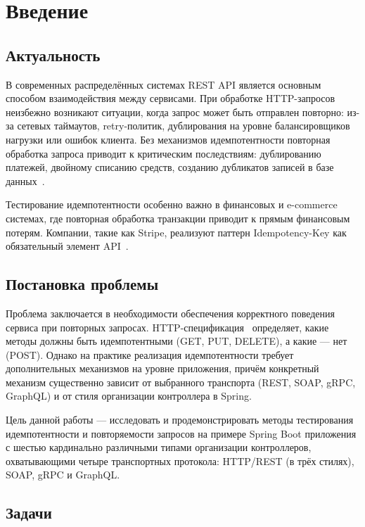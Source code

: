 \section{Введение}

\subsection{Актуальность}

В современных распределённых системах REST API является основным способом взаимодействия между сервисами. При обработке HTTP-запросов неизбежно возникают ситуации, когда запрос может быть отправлен повторно: из-за сетевых таймаутов, retry-политик, дублирования на уровне балансировщиков нагрузки или ошибок клиента. Без механизмов идемпотентности повторная обработка запроса приводит к критическим последствиям: дублированию платежей, двойному списанию средств, созданию дубликатов записей в базе данных~\cite{helland2012idempotence}.

Тестирование идемпотентности особенно важно в финансовых и e-commerce системах, где повторная обработка транзакции приводит к прямым финансовым потерям. Компании, такие как Stripe, реализуют паттерн Idempotency-Key как обязательный элемент API~\cite{stripe-idempotency}.

\subsection{Постановка проблемы}

Проблема заключается в необходимости обеспечения корректного поведения сервиса при повторных запросах. HTTP-спецификация~\cite{rfc9110} определяет, какие методы должны быть идемпотентными (GET, PUT, DELETE), а какие --- нет (POST). Однако на практике реализация идемпотентности требует дополнительных механизмов на уровне приложения, причём конкретный механизм существенно зависит от выбранного транспорта (REST, SOAP, gRPC, GraphQL) и от стиля организации контроллера в Spring.

Цель данной работы --- исследовать и продемонстрировать методы тестирования идемпотентности и повторяемости запросов на примере Spring Boot приложения с шестью кардинально различными типами организации контроллеров, охватывающими четыре транспортных протокола: HTTP/REST (в трёх стилях), SOAP, gRPC и GraphQL.

\subsection{Задачи}

